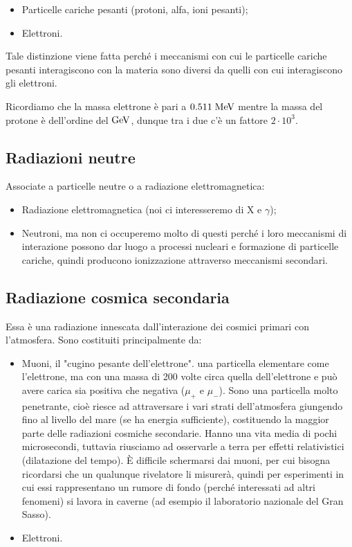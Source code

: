 \begin{itemize}
    \item Particelle cariche pesanti (protoni, alfa, ioni pesanti);
    \item Elettroni.
\end{itemize}

Tale distinzione viene fatta perché i meccanismi con cui le particelle cariche pesanti interagiscono con la materia sono diversi da quelli con cui interagiscono gli elettroni.

Ricordiamo che la massa elettrone è pari a $0.511 \; \rm MeV$ mentre la massa del protone è dell'ordine del $\rm GeV$, dunque tra i due c'è un fattore $2 \cdot 10^3$.

\subsection{Radiazioni neutre}
Associate a particelle neutre o a radiazione elettromagnetica:

\begin{itemize}
    \item Radiazione elettromagnetica (noi ci interesseremo di X e $\gamma$);
    \item Neutroni, ma non ci occuperemo molto di questi perché i loro meccanismi di interazione possono dar luogo a processi nucleari e formazione di particelle cariche, quindi producono ionizzazione attraverso meccanismi secondari.
\end{itemize}

\subsection{Radiazione cosmica secondaria}
Essa è una radiazione innescata dall'interazione dei cosmici primari con l'atmosfera. Sono costituiti principalmente da:

\begin{itemize}
    \item Muoni, il "cugino pesante dell'elettrone". \E una particella elementare come l'elettrone, ma con una massa di 200 volte circa quella dell'elettrone e può avere carica sia positiva che negativa ($\mu_{+}$ e $\mu_{-}$). Sono una particella molto penetrante, cioè riesce ad attraversare i vari strati dell'atmosfera giungendo fino al livello del mare (se ha energia sufficiente), costituendo la maggior parte delle radiazioni cosmiche secondarie. Hanno una vita media di pochi microsecondi, tuttavia riusciamo ad osservarle a terra per effetti relativistici (dilatazione del tempo). È difficile schermarsi dai muoni, per cui bisogna ricordarsi che un qualunque rivelatore li misurerà, quindi per esperimenti in cui essi rappresentano un rumore di fondo (perché interessati ad altri fenomeni) si lavora in caverne (ad esempio il laboratorio nazionale del Gran Sasso).
    \item Elettroni.
\end{itemize}

